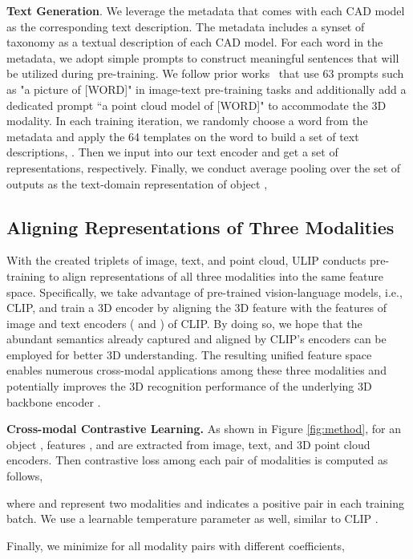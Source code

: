 \documentclass[10pt,twocolumn,letterpaper]{article}
\begin{document}
\noindent\textbf{Text Generation}. We leverage the metadata that comes with each CAD model as the corresponding text description. The metadata includes a synset of taxonomy as a textual description of each CAD model. For each word in the metadata, we adopt simple prompts to construct meaningful sentences that will be utilized during pre-training. We follow prior works~\cite{gu2021open,gao2021towards} that use 63 prompts such as "a picture of [WORD]" in image-text pre-training tasks and additionally add a dedicated prompt ``a point cloud model of [WORD]" to accommodate the 3D modality. 
In each training iteration, we randomly choose a word from the metadata and apply the 64 templates on the word to build a set of text descriptions, .
Then we input  into our text encoder  and get a set of representations, respectively. Finally, we conduct average pooling over the set of outputs as the text-domain representation  of object ,



\subsection{Aligning Representations of Three Modalities}
\label{sec:align representation}
With the created triplets of image, text, and point cloud, ULIP conducts pre-training to align representations of all three modalities into the same feature space.
Specifically, we take advantage of pre-trained vision-language models, i.e., CLIP, and train a 3D encoder by aligning the 3D feature with the features of image and text encoders ( and  ) of CLIP.
By doing so, we hope that the abundant semantics already captured and aligned by CLIP's encoders can be employed for better 3D understanding.
The resulting unified feature space enables numerous cross-modal applications among these three modalities and potentially improves the 3D recognition performance of the underlying 3D backbone encoder .




\noindent\textbf{Cross-modal Contrastive Learning.}
As shown in Figure \ref{fig:method}, for an object , features ,  and  are extracted from image, text, and 3D point cloud encoders. Then contrastive loss among each pair of modalities is computed as follows, 

where  and  represent two modalities and  indicates a positive pair in each training batch. We use a learnable temperature parameter  as well, similar to CLIP \cite{radford2021learning}.

Finally, we minimize  for all modality pairs with different coefficients, 
\end{document}
